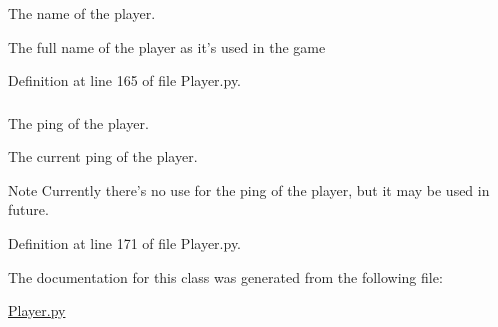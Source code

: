 The name of the player. 

The full name of the player as it's used in the game 

Definition at line 165 of file Player.py.

\hypertarget{class_player_1_1_player_ab675ec89c8e17a56d85f0304f46465ea}{
\subsubsection[{ping}]{}}
\label{class_player_1_1_player_ab675ec89c8e17a56d85f0304f46465ea}


The ping of the player. 

The current ping of the player. \begin{DoxyNote}{Note}
Currently there's no use for the ping of the player, but it may be used in future. 
\end{DoxyNote}


Definition at line 171 of file Player.py.



The documentation for this class was generated from the following file:\begin{DoxyCompactItemize}
\item 
\hyperlink{_player_8py}{Player.py}\end{DoxyCompactItemize}
